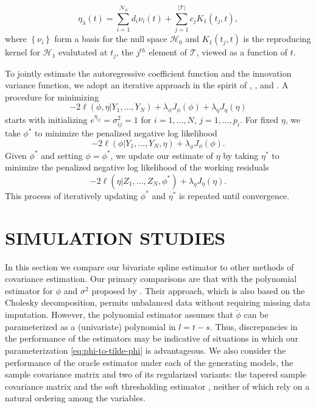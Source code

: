 \documentclass[12pt]{article}
\newcommand{\hilbert}{\mathcal{H}}
\begin{document}
\begin{equation} \label{eq:form-of-smoothing-spline-solution-kappa}
\eta_\lambda\left( t \right) = \sum_{i = 1}^{\mathcal{N}_0} d_i \nu_i\left( t \right) + \sum_{j = 1}^{\vert \mathcal{T} \vert} c_j K_1\left(t_j,t\right),
\end{equation}  
\noindent
where $\left\{\nu_i \right\}$ form a basis for the null space $\hilbert_0$ and $K_1\left(t_j,t\right)$ is the reproducing kernel for $\hilbert_1$ evalutated at ${t_j}$, the $j^{th}$ element of $\mathcal{T}$, viewed as a function of $t$.

To jointly estimate the autoregressive coefficient function and the innovation variance function, we adopt an iterative approach in the spirit of \cite{huang2006covariance}, \cite{huang2007estimation}, and \cite{pourahmadi2000maximum}. A procedure for minimizing 
\[
-2\ell\left(\phi,\eta \vert Y_1, \dots, Y_N  \right) + \lambda_\phi  J_\phi\left(\phi\right) + \lambda_\eta  J_\eta\left(\eta\right)
\]
starts with initializing $e^{\eta_{ij}} = \sigma^2_{ij} = 1$ for $i = 1,\dots, N$, $j = 1,\dots, p_i$.  For fixed $\eta$, we take $\phi^*$ to minimize the penalized negative log likelihood 
\[
-2\ell\left(\phi\vert Y_1, \dots, Y_N, \eta\right) + \lambda_\phi  J_\phi\left(\phi\right).
\]
\noindent
Given $\phi^*$ and setting $\phi = \phi^*$, we update our estimate of $\eta$ by taking $\eta^*$ to minimize the penalized negative log likelihood of the working residuals  
\[
-2\ell\left( \eta \vert Z_1,\dots, Z_N, \phi^* \right) + \lambda_\eta  J_\eta\left(\eta\right).
\]
This process of iteratively updating $\phi^*$ and ${\eta}^*$ is repeated until convergence. 

\section*{\sffamily \Large SIMULATION STUDIES}
In this section we compare our bivariate spline estimator to other methods of covariance estimation. Our primary comparisons are that with the polynomial estimator for $\phi$ and $\sigma^2$ proposed by . Their approach, which is also based on the Cholesky decomposition, permits unbalanced data without requiring missing data imputation. However, the polynomial estimator assumes that $\tilde{\phi}$ can be parameterized as a (univariate) polynomial in $l = t - s$. Thus, discrepancies in the performance of the estimators may be indicative of situations in which our parameterization \eqref{eq:phi-to-tilde-phi} is advantageous. We also consider the performance of the oracle estimator under each of the generating models, the sample covariance matrix and two of its regularized variants: the tapered sample covariance matrix \cite{cai2010optimal} and the soft thresholding estimator \cite{rothman2009generalized}, neither of which rely on a natural ordering among the variables. 
\end{document}
